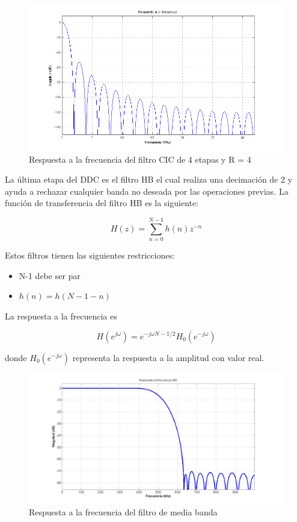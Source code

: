 \begin{figure}[hpt]
\centering
	\includegraphics[width=5.9in]{figs/cicresponse}
	\caption{Respuesta a la frecuencia del filtro CIC de 4 etapas y R =	4}
	\label{fig:cicresp}
\end{figure}

La \'ultima etapa del DDC es el filtro HB el cual realiza una decimaci\'on de 2
y ayuda a rechazar cualquier banda no deseada por las operaciones previas. La
funci\'on de transferencia del filtro HB \cite{nguyen} es la
siguiente:

\begin{equation}
H(z)=\sum_{n=0}^{N-1}h(n)z^{-n}
\end{equation}

Estos filtros tienen las siguientes restricciones:

\begin{itemize}
  \item N-1 debe ser par
  \item $h(n)=h(N-1-n)$
\end{itemize}

La respuesta a la frecuencia es

\begin{equation}
H(e^{j\omega})=e^{-j\omega N-1/2}H_0(e^{-j\omega})
\end{equation}

donde $H_0(e^{-j\omega})$ representa la respuesta a la amplitud con valor real.

\begin{figure}[hpt]
\centering
	\includegraphics[width=5.9in]{figs/hbresponse}
	\caption{Respuesta a la frecuencia del filtro de media banda}
	\label{fig:hbresp}
\end{figure}

